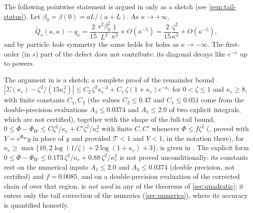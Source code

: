 \begin{remark}\label{prop:tail}
The following pointwise statement is argued in \cite{Note5} only as a sketch (see \cref{rem:tail-status}).  Let $\beta_0=\beta(0)=aL/(a+L)$.  As $\kappa\to+\infty$,
\begin{equation}\label{eq:tail}
 \widetilde Q_s(\kappa,\kappa)-q_\kappa
 =\frac2{15}\frac{s^2\beta_0^2}{L^2}\frac1{\kappa^3}+O(\kappa^{-5})
 =\frac2{15}\frac{\zeta^2}{\kappa^3}+O(\kappa^{-5}),
\end{equation}
and by particle--hole symmetry the same holds for holes as $\kappa\to-\infty$.
The first-order (in $s$) part of the defect does not contribute: its diagonal
decays like $e^{-\kappa}$ up to powers.
\end{remark}

\begin{remark}[Status]\label{rem:tail-status}
The argument in \cite{Note5} is a sketch; a complete proof of the remainder bound
$|\Sigma(\kappa_c)-\zeta^2/(15\kappa_c^2)|\le C_2\,\zeta^2\kappa_c^{-3}+C_1\,\zeta(1+\kappa_c)e^{-\kappa_c}$ for $0<\zeta\le1$ and $\kappa_c\ge8$, with finite constants $C_1,C_2$ (the values $C_2\le0.47$ and $C_1\le0.051$ come from the double-precision evaluations $A_3\le0.0374$ and $A_1\le2.0$ of two explicit integrals, which are not certified),
together with the shape of the full-tail bound, $0\le\Phi-\Phi_W\le C\zeta^2/\kappa_c+C'\zeta^2/\kappa_c^2$ with finite $C,C'$ whenever $\Phi\le f\zeta^2$ (\cite[Thm.~5.1]{RigorTB}, proved with $Y=e^{\Phi_W}y$ in place of $y$ and provided $\mathcal T<1$ and $Y<1$, in the notation there),
for $\kappa_c\ge\max\{10,2\log(1/\zeta)+2\log(1+\kappa_c)+3\}$, is given in \cite{RigorTB}.  The explicit form $0\le\Phi-\Phi_W\le0.173\,\zeta^2/\kappa_c+0.88\,\zeta^2/\kappa_c^2$ \cite[Cor.~5.2, eq.~(13)]{RigorTB} is not proved unconditionally: its constants rest on the numerical inputs $A_1\le2.0$ and $A_3\le0.0374$ (double precision, not certified) and $f=0.0085$, and on a double-precision evaluation of the corrected chain of \cite[Thm.~5.1]{RigorTB} over that region.
 is \emph{not used} in any of the theorems of
\cref{sec:quadratic}; it enters only the tail correction of the numerics
(\cref{sec:numerics}), where its accuracy is quantified honestly.
\end{remark}

